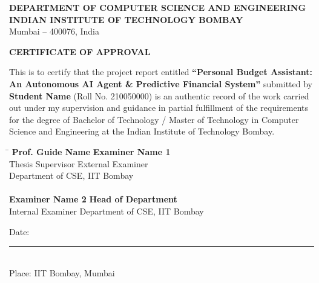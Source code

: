 \documentclass[12pt,a4paper,oneside]{report}
\begin{document}
\newpage

\thispagestyle{plain}
\begin{center}
    \Large \textbf{DEPARTMENT OF COMPUTER SCIENCE AND ENGINEERING} \\[0.2cm]
    \large \textbf{INDIAN INSTITUTE OF TECHNOLOGY BOMBAY} \\[0.2cm]
    Mumbai -- 400076, India
\end{center}

\vspace{1.0cm}

\begin{center}
    \Large \textbf{CERTIFICATE OF APPROVAL}
\end{center}

\vspace{0.5cm}

\noindent This is to certify that the project report entitled \textbf{``Personal Budget Assistant: An Autonomous AI Agent \& Predictive Financial System''} submitted by \textbf{Student Name} (Roll No. 210050000) is an authentic record of the work carried out under my supervision and guidance in partial fulfillment of the requirements for the degree of Bachelor of Technology / Master of Technology in Computer Science and Engineering at the Indian Institute of Technology Bombay.

\vspace{3.0cm}

\noindent
\begin{tabbing}
\hspace{8cm} \= \kill
\textbf{Prof. Guide Name} \> \textbf{Examiner Name 1} \\
Thesis Supervisor \> External Examiner \\
Department of CSE, IIT Bombay \> \\
\vspace{2cm} \\
\textbf{Examiner Name 2} \> \textbf{Head of Department} \\
Internal Examiner \> Department of CSE, IIT Bombay
\end{tabbing}

\vspace{1.0cm}
\noindent Date: \rule{4cm}{0.4pt} \\
\noindent Place: IIT Bombay, Mumbai

\newpage
\end{document}
